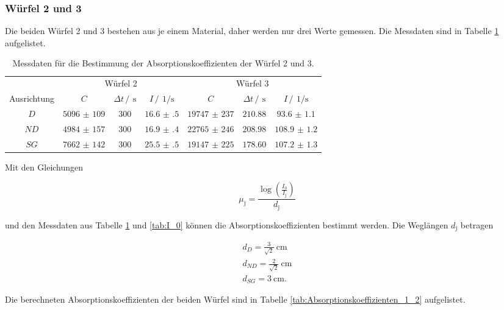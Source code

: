 \subsubsection{Würfel 2 und 3}

Die beiden Würfel 2 und 3 bestehen aus je einem Material, daher werden nur drei Werte gemessen.
Die Messdaten sind in Tabelle \ref{tab:Würfel_1_2} aufgelistet.

\FloatBarrier
\begin{table}
    \centering
    \caption{Messdaten für die Bestimmung der Absorptionskoeffizienten der Würfel 2 und 3.}
    \label{tab:Würfel_1_2}
    \begin{tabular}{c c c c c c c}
        \toprule
        &\multicolumn{3}{c}{Würfel 2}&\multicolumn{3}{c}{Würfel 3}\\
        \cmidrule(lr){2-4}\cmidrule(lr){5-7}
        Ausrichtung&$C$&$\Delta t \,/\,\SI{}{\second}$&$I \,/\,\SI{}{1\per\second}$&$C$&$\Delta t \,/\,\SI{}{\second}$&$I \,/\,\SI{}{1\per\second}$\\
        \midrule
        $D$ &$\num{5096(109)}$&$\num{300}$&$\num{16.6(5)}$&$\num{19747(237)}$&$\num{210.88}$&$\num{93.6(11)}$\\
        $ND$&$\num{4984(157)}$&$\num{300}$&$\num{16.9(4)}$&$\num{22765(246)}$&$\num{208.98}$&$\num{108.9(12)}$\\
        $SG$&$\num{7662(142)}$&$\num{300}$&$\num{25.5(5)}$&$\num{19147(225)}$&$\num{178.60}$&$\num{107.2(13)}$\\
        \bottomrule
    \end{tabular}
\end{table}
\FloatBarrier

Mit den Gleichungen

\begin{equation*}
    \mu_{\text{j}}= \frac{\log{\left(\frac{I_0}{I_\text{j}}\right)}}{d_{\text{j}}}
\end{equation*} 

und den Messdaten aus Tabelle \ref{tab:Würfel_1_2} und \ref{tab:I_0} können die Absorptionskoeffizienten bestimmt werden. 
Die Weglängen $d_{\text{j}}$ betragen

\begin{gather*}
    d_{D} =\frac{3}{\sqrt{2}}\SI{}{\centi\meter}\\
    d_{ND}=\frac{2}{\sqrt{2}}\SI{}{\centi\meter}\\
    d_{SG}=\SI{3}{\centi\meter}.
\end{gather*}

Die berechneten Absorptionskoeffizienten der beiden Würfel sind in Tabelle \ref{tab:Absorptionskoeffizienten_1_2} aufgelistet.

